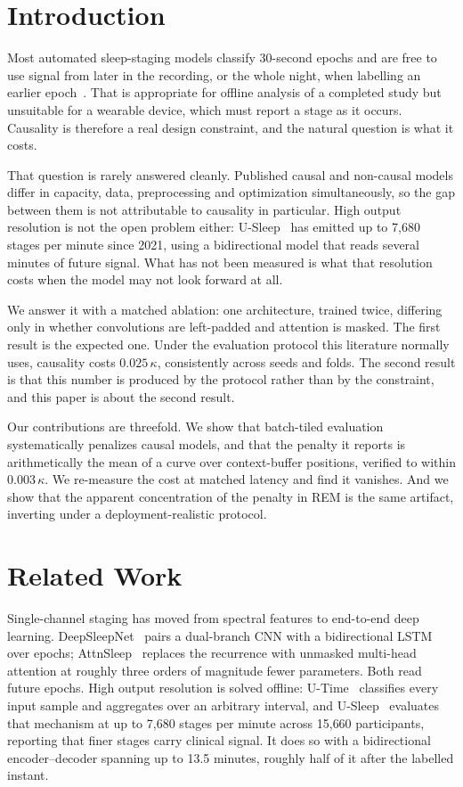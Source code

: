 \documentclass[conference]{IEEEtran}
\begin{document}
\section{Introduction}

Most automated sleep-staging models classify 30-second epochs and are free to use signal from
later in the recording, or the whole night, when labelling an earlier epoch~\cite{deepsleepnet,
attnsleep}. That is appropriate for offline analysis of a completed study but unsuitable for a
wearable device, which must report a stage as it occurs. Causality is therefore a real design
constraint, and the natural question is what it costs.

That question is rarely answered cleanly. Published causal and non-causal models differ in
capacity, data, preprocessing and optimization simultaneously, so the gap between them is not
attributable to causality in particular. High output resolution is not the open problem either:
U-Sleep~\cite{usleep} has emitted up to 7{,}680 stages per minute since 2021, using a
bidirectional model that reads several minutes of future signal. What has not been measured is
what that resolution costs when the model may not look forward at all.

We answer it with a matched ablation: one architecture, trained twice, differing only in whether
convolutions are left-padded and attention is masked. The first result is the expected one. Under
the evaluation protocol this literature normally uses, causality costs $0.025\,\kappa$,
consistently across seeds and folds. The second result is that this number is produced by the
protocol rather than by the constraint, and this paper is about the second result.

Our contributions are threefold. We show that batch-tiled evaluation systematically penalizes
causal models, and that the penalty it reports is arithmetically the mean of a curve over
context-buffer positions, verified to within $0.003\,\kappa$. We re-measure the cost at matched
latency and find it vanishes. And we show that the apparent concentration of the penalty in REM
is the same artifact, inverting under a deployment-realistic protocol.

\section{Related Work}

Single-channel staging has moved from spectral features to end-to-end deep learning.
DeepSleepNet~\cite{deepsleepnet} pairs a dual-branch CNN with a bidirectional LSTM over epochs;
AttnSleep~\cite{attnsleep} replaces the recurrence with unmasked multi-head attention at roughly
three orders of magnitude fewer parameters. Both read future epochs. High output resolution is
solved offline: U-Time~\cite{utime} classifies every input sample and aggregates over an arbitrary
interval, and U-Sleep~\cite{usleep} evaluates that mechanism at up to 7{,}680 stages per minute
across 15{,}660 participants, reporting that finer stages carry clinical signal. It does so with a
bidirectional encoder--decoder spanning up to 13.5 minutes, roughly half of it after the labelled
instant.
\end{document}

